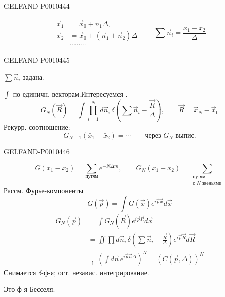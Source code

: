 \begin{GelfandAdjacentEvidence}{GELFAND-P001044}{4}

\[
\begin{aligned}
\vec{x}_1&=\vec{x}_0+n_1\Delta,\\
\vec{x}_2&=\vec{x}_0+(\vec{n}_1+\vec{n}_2)\Delta\\
&\cdots\cdots\cdots
\end{aligned}
\qquad
\sum\vec{n}_i=\frac{x_1-x_2}{\Delta}
\]
\end{GelfandAdjacentEvidence}
\begin{GelfandAdjacentEvidence}{GELFAND-P001044}{5}


$\sum\vec{n}_i$ задана.

$\int$ по единичн. векторам.\quad Интересуемся .
\begin{equation*}
G_N(\vec{R})=\int\prod_{i=1}^{N}d\vec{n}_i\,
\delta\left(\sum\vec{n}_i-\frac{\vec{R}}{\Delta}\right),
\qquad\vec{R}=\vec{x}_N-\vec{x}_0
\tag{15}
\end{equation*}
Рекурр. соотношение:
\[
G_{N+1}(\bar{x}_1-\bar{x}_2)=\cdots
\qquad\text{через }G_N\text{ выпис}.
\]
\end{GelfandAdjacentEvidence}
\begin{GelfandAdjacentEvidence}{GELFAND-P001044}{6}

\begin{equation*}
G(x_1-x_2)=\sum_{\text{путям}}e^{-N\Delta m},
\qquad
G_N(x_1-x_2)=\sum_{\substack{\text{путям}\\\text{с }N\text{ звеньями}}}
\tag{16}
\end{equation*}
Рассм. Фурье-компоненты
\begin{equation*}
G(\vec{p})=\int G(\vec{x})e^{i\vec{p}\vec{x}}d\vec{x}
\tag{17}
\end{equation*}
\begin{equation*}
\begin{aligned}
G_N(\vec{p})&=\int G_N(\vec{R})e^{i\vec{p}\vec{R}}d\vec{x}\\
&=\iint\prod d\vec{n}_i\,
\delta\left(\sum\vec{n}_i-\frac{\vec{R}}{\Delta}\right)
e^{i\vec{p}\vec{R}}d\vec{R}\\
&\underset{\uparrow}{=}
\left(\int d\vec{n}\,e^{i\vec{p}\vec{n}\Delta}\right)^N
=(C(\vec{p},\Delta))^N
\end{aligned}
\tag{18}
\end{equation*}
Снимается $\delta$-ф-я; ост. независ. интегрирование.

Это ф-я Бесселя.
\end{GelfandAdjacentEvidence}
